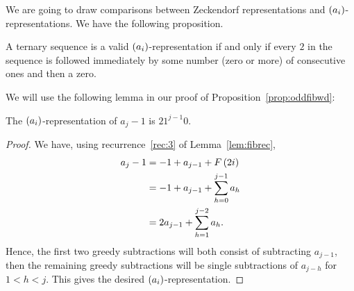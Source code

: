 \documentclass[english,12pt]{article}
\newcommand{\seq}{\p}
\begin{document}
We are going to draw comparisons between Zeckendorf representations and $\seq{a_i}$-representations.  We have the following proposition.
\begin{prop}\label{prop:oddfibwd}
A ternary sequence is a valid $\seq{a_i}$-representation if and only if every $2$ in the sequence is followed immediately by some number (zero or more) of consecutive ones and then a zero.
\end{prop}
We will use the following lemma in our proof of Proposition~\ref{prop:oddfibwd}:
\begin{lemma}\label{lem:oddfiba}
The $\seq{a_i}$-representation of $a_j-1$ is $21^{j-1}0$.
\end{lemma}
\begin{proof}
We have, using recurrence~\ref{rec:3} of Lemma~\ref{lem:fibrec},
\begin{align*}
a_j-1&=-1+a_{j-1}+F\left(2i\right)\\
&=-1+a_{j-1}+\sum_{h=0}^{j-1}a_h\\
&=2a_{j-1}+\sum_{h=1}^{j-2}a_h.
\end{align*}
Hence, the first two greedy subtractions will both consist of subtracting $a_{j-1}$, then the remaining greedy subtractions will be single subtractions of $a_{j-h}$ for $1<h<j$.  This gives the desired $\seq{a_i}$-representation.
\end{proof}
\end{document}
